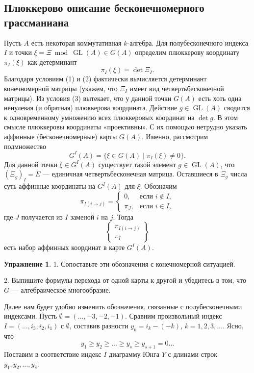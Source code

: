 \documentclass{article}
\theoremstyle{definition}
\theoremstyle{definition} %
\theoremstyle{remark}     %
\theoremstyle{definition}
\theoremstyle{definition}
\theoremstyle{definition}
\theoremstyle{definition}
\theoremstyle{definition}
\theoremstyle{definition}
\theoremstyle{definition}
\theoremstyle{definition}
\newtheorem{exercise}{Упражнение}[section]
\begin{document}
\subsection{Плюккерово описание бесконечномерного грассманиана}





Пусть \( A \) есть некоторая коммутативная \( k \)-алгебра. Для полубесконечного индекса \( I \) и точки \( \xi = \Xi \bmod \operatorname{GL}(A) \in G(A) \) определим плюккерову координату \( \pi_I(\xi) \) как детерминант
\[
\pi_I(\xi) = \det \Xi_I.
\]
Благодаря условиям (1) и (2) фактически вычисляется детерминант конечномерной матрицы (укажем, что \( \Xi_I \) имеет вид четвертьбесконечной матрицы). Из условия (3) вытекает, что у данной точки \( G(A) \) есть хоть одна ненулевая (и обратная) плюккерова координата. Действие \( g \in \operatorname{GL}(A) \) сводится к одновременному умножению всех плюккеровых координат на \( \det g \). В этом смысле плюккеровы координаты «проективны». С их помощью нетрудно указать аффинные (бесконечномерные) карты \( G(A) \). Именно, рассмотрим подмножество
\[
G^I(A) = \{ \xi \in G(A) \mid \pi_I(\xi) \neq 0 \}.
\]
Для данной точки \( \xi \in G^I(A) \) существует такой элемент \( g \in \operatorname{GL}(A) \), что \( (\Xi_g)_I = E \) — единичная четвертьбесконечная матрица. Оставшиеся в \( \Xi_g \) числа суть аффинные координаты на \( G^I(A) \) для \( \xi \). Обозначим
\[
\pi_{I(i \to j)} = 
\begin{cases} 
0, & \text{если } i \notin I, \\
\pi_J, & \text{если } i \in I,
\end{cases}
\]
где \( J \) получается из \( I \) заменой \( i \) на \( j \). Тогда
\[
\left\{ 
\begin{array}{c}
\pi_{I(i \to j)} \\
\pi_I
\end{array} 
\right\}
\]
есть набор аффинных координат в карте \( G^I(A) \).

\begin{exercise}
  1. Сопоставьте эти обозначения с конечномерной ситуацией.
  
  2. Выпишите формулы перехода от одной карты к другой и убедитесь в том, что \( G \) — алгебраическое многообразие.
\end{exercise}

Далее нам будет удобно изменить обозначения, связанные с полубесконечными индексами. Пусть \( \emptyset = ( \dots, -3, -2, -1 ) \). Сравним произвольный индекс \( I = ( \dots, i_3, i_2, i_1 ) \) с \( \emptyset \), составив разности \( y_k = i_k - (-k) \), \( k = 1, 2, 3, \dots \). Ясно, что
\[
y_1 \geq y_2 \geq \dots \geq y_s \geq y_{s+1} = 0 \dots
\]
Поставим в соответствие индекс \( I \) диаграмму Юнга \( Y \) с длинами строк \( y_1, y_2, \dots, y_s \):
\end{document}
